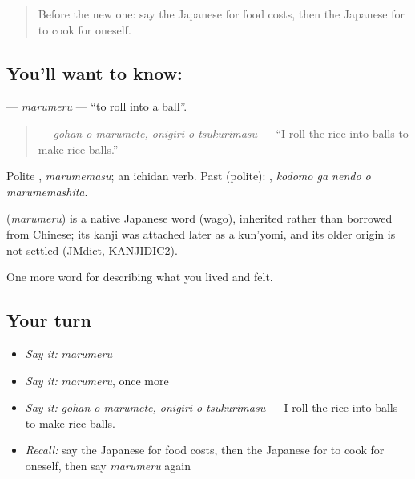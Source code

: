 \label{lesson:JA-C497-marumeru}



\begin{quote}
Before the new one: say the Japanese for food costs, then the Japanese for to cook for oneself.
\end{quote}

\subsection*{You'll want to know: }
\textbf{} — \emph{marumeru} — \textquotedblleft{}to roll into a ball\textquotedblright{}.

\begin{quote}
\textbf{  } — \emph{gohan o marumete, onigiri o tsukurimasu} — \textquotedblleft{}I roll the rice into balls to make rice balls.\textquotedblright{}
\end{quote}

Polite \textbf{}, \emph{marumemasu}; an ichidan verb. Past (polite): \textbf{  }, \emph{kodomo ga nendo o marumemashita}.

\begin{cousinweb}
\textbf{} (\emph{marumeru}) is a native Japanese word (wago), inherited rather than borrowed from Chinese; its kanji was attached later as a kun'yomi, and its older origin is not settled (JMdict, KANJIDIC2).
\end{cousinweb}

\begin{grammarlens}[title={What you've built}]
One more word for describing what you lived and felt.
\end{grammarlens}

\subsection*{Your turn}
\begin{itemize}
\raggedright
  \item \emph{Say it:} \emph{marumeru}
  \item \emph{Say it:} \emph{marumeru}, once more
  \item \emph{Say it:} \emph{gohan o marumete, onigiri o tsukurimasu} — I roll the rice into balls to make rice balls.
  \item \emph{Recall:} say the Japanese for food costs, then the Japanese for to cook for oneself, then say \emph{marumeru} again
\end{itemize}

